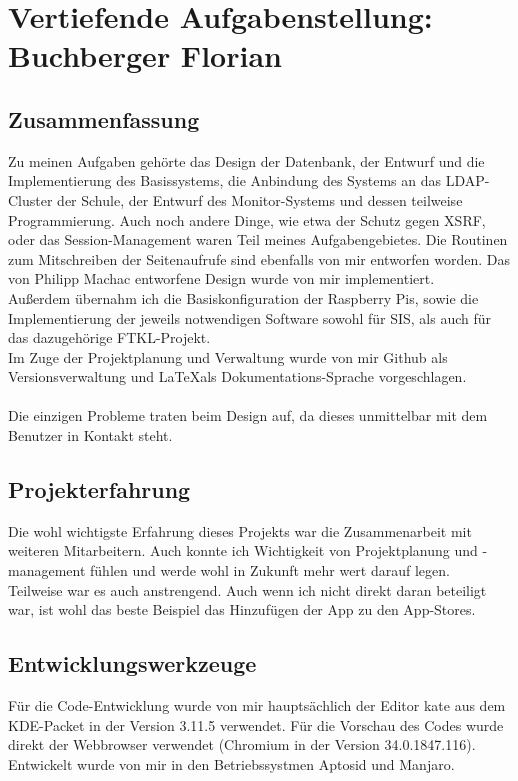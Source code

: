 \chapter[Buchberger]{Vertiefende Aufgabenstellung:\\Buchberger Florian}

\section{Zusammenfassung}
Zu meinen Aufgaben gehörte das Design der Datenbank, der Entwurf und die Implementierung des Basissystems, die Anbindung des Systems an das LDAP-Cluster der Schule, der Entwurf des Monitor-Systems und dessen teilweise Programmierung. Auch noch andere Dinge, wie etwa der Schutz gegen XSRF, oder das Session-Management waren Teil meines Aufgabengebietes. Die Routinen zum Mitschreiben der Seitenaufrufe sind ebenfalls von mir entworfen worden. Das von Philipp Machac entworfene Design wurde von mir implementiert.\\
Außerdem übernahm ich die Basiskonfiguration der Raspberry Pis, sowie die Implementierung der jeweils notwendigen Software sowohl für SIS, als auch für das dazugehörige FTKL-Projekt.\\
Im Zuge der Projektplanung und Verwaltung wurde von mir Github als Versionsverwaltung und \LaTeX  als Dokumentations-Sprache vorgeschlagen.\\
\\
Die einzigen Probleme traten beim Design auf, da dieses unmittelbar mit dem Benutzer in Kontakt steht.
\section{Projekterfahrung}
Die wohl wichtigste Erfahrung dieses Projekts war die Zusammenarbeit mit weiteren Mitarbeitern. Auch konnte ich Wichtigkeit von Projektplanung und -management fühlen und werde wohl in Zukunft mehr wert darauf legen.\\
Teilweise war es auch anstrengend. Auch wenn ich nicht direkt daran beteiligt war, ist wohl das beste Beispiel das Hinzufügen der App zu den App-Stores.

\newpage
\section{Entwicklungswerkzeuge}
Für die Code-Entwicklung wurde von mir hauptsächlich der Editor kate aus dem KDE-Packet in der Version 3.11.5 verwendet. Für die Vorschau des Codes wurde direkt der Webbrowser verwendet (Chromium in der Version 34.0.1847.116).\\
Entwickelt wurde von mir in den Betriebssystmen Aptosid und Manjaro.
